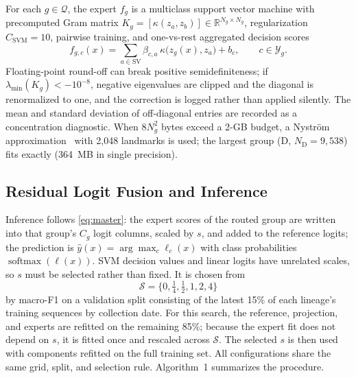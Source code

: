 \documentclass[conference]{IEEEtran}
\begin{document}
For each $g\in\mathcal{Q}$, the expert $f_g$ is a multiclass support vector machine with precomputed Gram matrix $K_g=[\kappa(z_a,z_b)]\in\mathbb{R}^{N_g\times N_g}$, regularization $C_{\mathrm{SVM}}=10$, pairwise training, and one-vs-rest aggregated decision scores
\begin{equation}
    f_{g,c}(x)=\sum_{a\in\mathrm{SV}}\beta_{c,a}\,\kappa\big(z_g(x),z_a\big)+b_c,\qquad c\in\mathcal{Y}_g.
    \label{eq:svm}
\end{equation}
Floating-point round-off can break positive semidefiniteness; if $\lambda_{\min}(K_g)<-10^{-8}$, negative eigenvalues are clipped and the diagonal is renormalized to one, and the correction is logged rather than applied silently. The mean and standard deviation of off-diagonal entries are recorded as a concentration diagnostic. When $8N_g^2$ bytes exceed a 2-GB budget, a Nystr\"om approximation~\cite{williams2001nystrom} with 2,048 landmarks is used; the largest group (D, $N_{\mathrm{D}}=9{,}538$) fits exactly (364~MB in single precision).

\subsection{Residual Logit Fusion and Inference}
\label{sec:fusion}

Inference follows \eqref{eq:master}: the expert scores of the routed group are written into that group's $C_g$ logit columns, scaled by $s$, and added to the reference logits; the prediction is $\hat{y}(x)=\arg\max_c\ell_c(x)$ with class probabilities $\operatorname{softmax}(\ell(x))$. SVM decision values and linear logits have unrelated scales, so $s$ must be selected rather than fixed. It is chosen from
\begin{equation}
    \mathcal{S}=\{0,\tfrac14,\tfrac12,1,2,4\}
\end{equation}
by macro-F1 on a validation split consisting of the latest 15\% of each lineage's training sequences by collection date. For this search, the reference, projection, and experts are refitted on the remaining 85\%; because the expert fit does not depend on $s$, it is fitted once and rescaled across $\mathcal{S}$. The selected $s$ is then used with components refitted on the full training set. All configurations share the same grid, split, and selection rule. Algorithm~1 summarizes the procedure.
\end{document}
